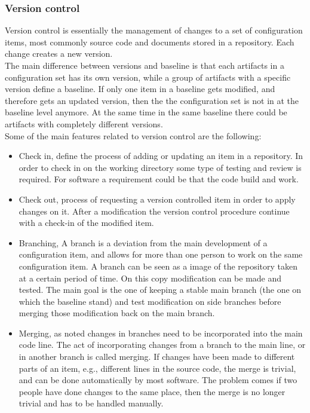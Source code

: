 \documentclass[../main.tex]{subfiles}
\begin{document}
\subsubsection{Version control}
Version control is essentially the management of changes to a set of configuration items, most commonly source code and documents stored in a repository. Each change creates a new version.\\ 
The main difference between versions and baseline is that each artifacts in a configuration set has its own version, while a group of artifacts with a specific version define a baseline. If only one item in a baseline gets modified, and therefore gets an updated version, then the the configuration set is not in at the baseline level anymore. At the same time in the same baseline there could be artifacts with completely different versions.\\
Some of the main features related to version control are the following:
\begin{itemize}
    \item Check in, define the process of adding or updating an item in a repository. In order to check in on the working directory some type of testing and review is required. For software a requirement could be that the code build and work. 
    \item Check out, process of requesting a version controlled item in order to apply changes on it. After a modification the version control procedure continue with a check-in of the modified item. 
    \item Branching, A branch is a deviation from the main development of a configuration item, and allows for more than one person to work on the same configuration item. A branch can be seen as a image of the repository taken at a certain period of time. On this copy modification can be made and tested. The main goal is the one of keeping a stable main branch (the one on which the baseline stand) and test modification on side branches before merging those modification back on the main branch.
    \item Merging, as noted changes in branches need to be incorporated into the main code line. The act of incorporating changes from a branch to the main line, or in another branch is called merging. If changes have been made to different parts of an item, e.g., different lines in the source code, the merge is trivial, and can be done automatically by most software. The problem comes if two people have done changes to the same place, then the merge is no longer trivial and has to be handled manually.
\end{itemize}
\end{document}
